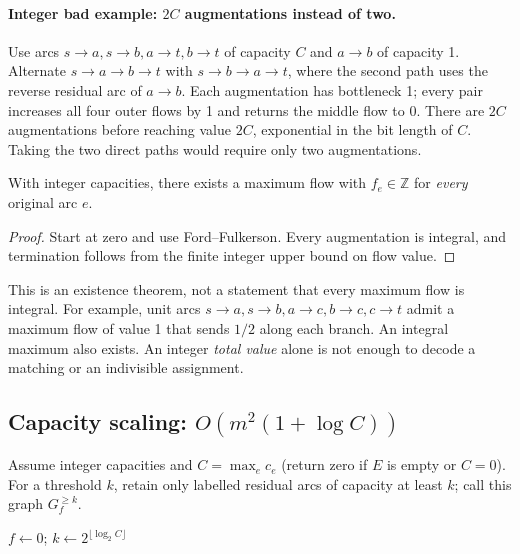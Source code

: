 \paragraph{Integer bad example: $2C$ augmentations instead of two.}
Use arcs $s\to a,s\to b,a\to t,b\to t$ of capacity $C$ and
$a\to b$ of capacity 1. Alternate $s\to a\to b\to t$ with
$s\to b\to a\to t$, where the second path uses the reverse residual arc
of $a\to b$. Each augmentation has bottleneck 1; every pair increases all
four outer flows by 1 and returns the middle flow to 0. There are $2C$
augmentations before reaching value $2C$, exponential in the bit length of
$C$. Taking the two direct paths would require only two augmentations.

\begin{theorem}\label{nf:integrality}
With integer capacities, there exists a maximum flow with $f_e\in\mathbb Z$
for \emph{every} original arc $e$.
\end{theorem}
\begin{proof}
Start at zero and use Ford--Fulkerson. Every augmentation is integral, and
termination follows from the finite integer upper bound on flow value.
\end{proof}
This is an existence theorem, not a statement that every maximum flow is
integral. For example, unit arcs $s\to a,s\to b,a\to c,b\to c,c\to t$
admit a maximum flow of value 1 that sends $1/2$ along each branch.
An integral maximum also exists. An integer \emph{total value} alone is not
enough to decode a matching or an indivisible assignment.

\subsection{Capacity scaling: \texorpdfstring{$O(m^2(1+\log C))$}{O(m squared log C)}}\label{nf:scaling}
Assume integer capacities and $C=\max_e c_e$ (return zero if $E$ is empty or
$C=0$). For a threshold $k$, retain only labelled residual arcs of capacity
at least $k$; call this graph $G_f^{\ge k}$.

\begin{algorithm}[H]
\caption{Capacity scaling: augment only through residual capacities $\ge k$}
$f\gets0$; $k\gets2^{\lfloor\log_2 C\rfloor}$\;
\;
\end{algorithm}
